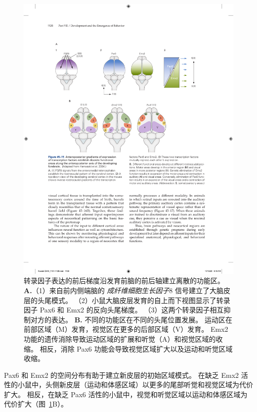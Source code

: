 \begin{figure}[htbp]
	\centering
	\includegraphics[width=1.0\linewidth]{chap45/fig_45_15}
	\caption{转录因子表达的前后梯度沿发育前脑的前后轴建立离散的功能区\cite{hamasaki2004emx2}。
		\textbf{A.}（1）来自前内侧端脑的 \textit{成纤维细胞生长因子}8 信号建立了大脑皮层的头尾模式。
		（2）小鼠大脑皮层发育的自上而下视图显示了转录因子 Pax6 和 Emx2 的反向头尾梯度。
		（3）这两个转录因子相互抑制对方的表达。
		\textbf{B.} 不同的功能区在不同的头尾位置发展。
		运动区在前部区域（M）发育，视觉区在更多的后部区域（V）发育。
		Emx2 功能的遗传消除导致运动区域的扩展和听觉（A）和视觉区域的收缩。
		相反，消除 Pax6 功能会导致视觉区域扩大以及运动和听觉区域收缩。}
	\label{fig:45_15}
\end{figure}


Pax6 和 Emx2 的空间分布有助于建立新皮层的初始区域模式。
在缺乏 Emx2 活性的小鼠中，头侧新皮层（运动和体感区域）以更多的尾部听觉和视觉区域为代价扩大。
相反，在缺乏 Pax6 活性的小鼠中，视觉和听觉区域以运动和体感区域为代价扩大（图~\ref{fig:45_15}B）。



